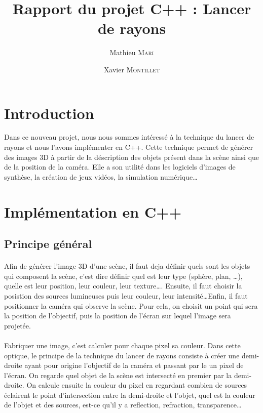 \documentclass{article}
\title{Rapport du projet C++ : Lancer de rayons}
\author{Mathieu \textsc{Mari} \and Xavier \textsc{Montillet}}
\begin{document}
\maketitle
\tableofcontents
	

\section{Introduction}
Dans ce nouveau projet, nous nous sommes intéressé à la technique du lancer de rayons et nous l'avons implémenter en C++.
Cette technique permet de générer des images 3D à partir de la déscription des objets présent dans la scène ainsi que de la position de la caméra. Elle a son utilité dans les logiciels d'images de synthèse, la création de jeux vidéos, la simulation numérique\dots  	

\section{Implémentation en C++}
	\subsection{Principe général}
	\paragraph{}		
Afin de générer l'image 3D d'une scène, il faut deja définir quels sont les objets qui composent la scène, c'est dire définir quel est leur type (sphère, plan, \dots), quelle est leur position, leur couleur, leur texture\dots. Ensuite, il faut choisir la posistion des sources lumineuses puis leur couleur, leur intensité\dots Enfin, il faut positionner la caméra qui observe la scène. Pour cela, on choisit un point qui sera la position de l'objectif, puis la position de l'écran sur lequel l'image sera projetée.

	\paragraph{}
		Fabriquer une image, c'est calculer pour chaque pixel sa couleur. Dans cette optique, le principe de la technique du lancer de rayons consiste à créer une demi-droite ayant pour origine l'objectif de la caméra et passant par le un pixel de l'écran. On regarde quel objet de la scène est intersecté en premier par la demi-droite. On calcule ensuite la couleur du pixel en regardant combien de sources éclairent le point d'intersection entre la demi-droite et l'objet, quel est la couleur de l'objet et des sources, est-ce qu'il y a reflection, refraction, transparence\dots
\end{document}
